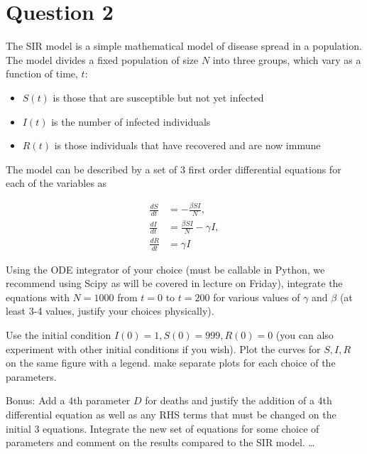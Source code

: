 \documentclass[12pt]{article}
\begin{document}
\section*{Question 2}


The SIR model is a simple mathematical model of disease spread in a population.
The model divides a fixed population of size $N$ into three groups, which vary as a function of time, $t$:

\begin{itemize}
    \item $S(t)$ is those that are susceptible but not yet infected
    \item $I(t)$ is the number of infected individuals
    \item $R(t)$ is those individuals that have recovered and are now immune
\end{itemize}

The model can be described by a set of 3 first order differential equations for each of the variables as

\begin{align}
    \frac{dS}{dt} &= -\frac{\beta S I}{N},\\
    \frac{dI}{dt} &= \frac{\beta S I}{N} - \gamma I,\\
    \frac{dR}{dt} &= \gamma I
\end{align}

Using the ODE integrator of your choice (must be callable in Python, we recommend using Scipy as will be covered in lecture on Friday), integrate the equations with $N=1000$ from $t=0$ to $t=200$ for various values of $\gamma$ and $\beta$ (at least 3-4 values, justify your choices physically).

Use the initial condition $I(0) = 1, S(0)=999, R(0) = 0$ (you can also experiment with other initial conditions if you wish).
Plot the curves for $S, I, R$ on the same figure with a legend. make separate plots for each choice of the parameters.

Bonus: Add a 4th parameter $D$ for deaths and justify the addition of a 4th differential equation as well as any RHS terms that must be changed on the initial 3 equations. Integrate the new set of equations for some choice of parameters and comment on the results compared to the SIR model. \ldots

\end{document}
